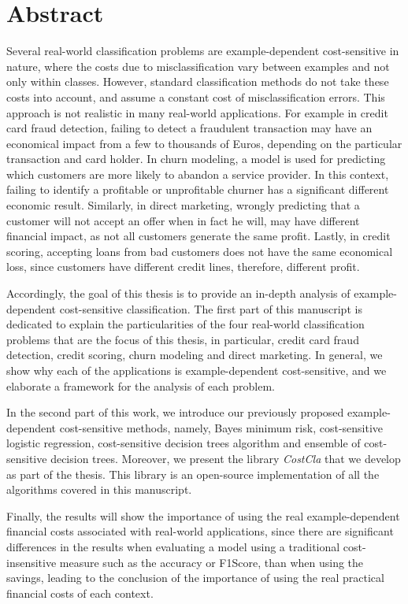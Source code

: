 \chapter*{Abstract}

Several real-world classification problems are example-dependent cost-sensitive in nature, where the 
costs due to misclassification vary between examples and not only within classes. However, standard 
classification methods do not take these costs into account, and assume a constant cost of 
misclassification errors. This approach is not realistic in many real-world applications. For  
example in credit card fraud detection, failing to detect a fraudulent transaction may have an 
economical impact from a few to thousands of Euros, depending on the particular transaction and card 
holder. In churn modeling, a model is used for predicting which customers are more likely to 
abandon a service provider. In this context, failing to identify a   profitable or unprofitable 
churner has a significant different economic   result. Similarly, in direct marketing, wrongly 
predicting that a customer   will not accept an offer when in fact he will, may have different 
financial impact, as not all   customers generate the same profit. Lastly, in credit scoring, 
accepting   loans from bad customers does not have the same economical loss, since customers have 
different   credit lines, therefore, different profit.

Accordingly, the goal of this thesis is to provide an in-depth analysis of example-dependent 
cost-sensitive classification. The first part of this manuscript is dedicated to explain the 
particularities of the four real-world classification problems that are the focus of this thesis, in 
particular, credit card fraud detection, credit scoring, churn modeling and direct marketing. In 
general, we show why each of the applications is example-dependent cost-sensitive, and we elaborate 
a framework for the analysis of each problem. 

In the second part of this work, we introduce our previously proposed example-dependent 
cost-sensitive methods, namely, Bayes minimum risk, cost-sensitive logistic regression, 
cost-sensitive decision trees algorithm and ensemble of cost-sensitive decision trees.
Moreover, we present the library \mbox{\textit{CostCla}} that we develop as part of the thesis. 
This library is an open-source implementation of all the algorithms covered in this manuscript.


Finally, the results will show the importance of using the real example-dependent financial 
costs associated with real-world applications, since there are significant differences in the 
results when evaluating a model using a traditional cost-insensitive measure such as the accuracy 
or F1Score,  than when using the savings, leading to the conclusion of the importance of using the 
real practical financial costs of each context.


